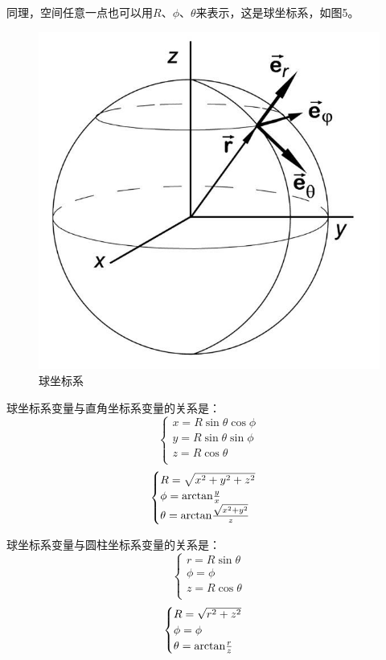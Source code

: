 \documentclass[UTF8,a4paper,11pt]{article}
\begin{document}
同理，空间任意一点也可以用$R$、$\phi$、$\theta$来表示，这是球坐标系，如图5。
\begin{figure}[htbp]
\centering
\includegraphics[scale=0.2]{p5.jpg}
\caption{球坐标系}
\end{figure}

球坐标系变量与直角坐标系变量的关系是：
\begin{equation}
\begin{cases}
x=R\sin\theta\cos\phi \\
y=R\sin\theta\sin\phi \\
z=R\cos\theta \\
\end{cases}
\end{equation}
\begin{equation}
\begin{cases}
R=\sqrt{x^2+y^2+z^2} \\
\phi={\rm arctan}\frac{y}{x} \\
\theta={\rm arctan}\frac{\sqrt{x^2+y^2}}{z} \\
\end{cases}
\end{equation}

球坐标系变量与圆柱坐标系变量的关系是：
\begin{equation}
\begin{cases}
r=R\sin\theta \\
\phi=\phi \\
z=R\cos\theta \\
\end{cases}
\end{equation}
\begin{equation}
\begin{cases}
R=\sqrt{r^2+z^2} \\
\phi=\phi \\
\theta={\rm arctan}\frac{r}{z} \\
\end{cases}
\end{equation}
\end{document}
